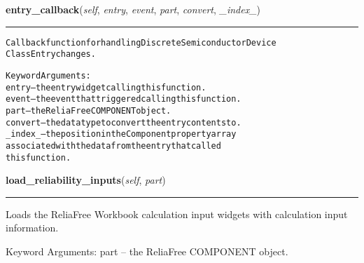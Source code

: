     \label{reliafree:semiconductors:semiconductor:Semiconductor:entry_callback}

    \vspace{0.5ex}

\hspace{.8\funcindent}\begin{boxedminipage}{\funcwidth}

    \raggedright \textbf{entry\_callback}(\textit{self}, \textit{entry}, \textit{event}, \textit{part}, \textit{convert}, \textit{\_index\_})

    \vspace{-1.5ex}

    \rule{\textwidth}{0.5\fboxrule}
\setlength{\parskip}{2ex}
\begin{alltt}
Callback function for handling Discrete Semiconductor Device
Class Entry changes.

Keyword Arguments:
  entry -- the entry widget calling this function.
  event -- the event that triggered calling this function.
   part -- the ReliaFree COMPONENT object.
convert -- the data type to convert the entry contents to.
\_index\_ -- the position in the Component property array
           associated with the data from the entry that called
           this function.
\end{alltt}

\setlength{\parskip}{1ex}
    \end{boxedminipage}

    \label{reliafree:semiconductors:semiconductor:Semiconductor:load_reliability_inputs}

    \vspace{0.5ex}

\hspace{.8\funcindent}\begin{boxedminipage}{\funcwidth}

    \raggedright \textbf{load\_reliability\_inputs}(\textit{self}, \textit{part})

    \vspace{-1.5ex}

    \rule{\textwidth}{0.5\fboxrule}
\setlength{\parskip}{2ex}
    Loads the ReliaFree Workbook calculation input widgets with calculation
    input information.

    Keyword Arguments: part -- the ReliaFree COMPONENT object.

\setlength{\parskip}{1ex}
    \end{boxedminipage}


